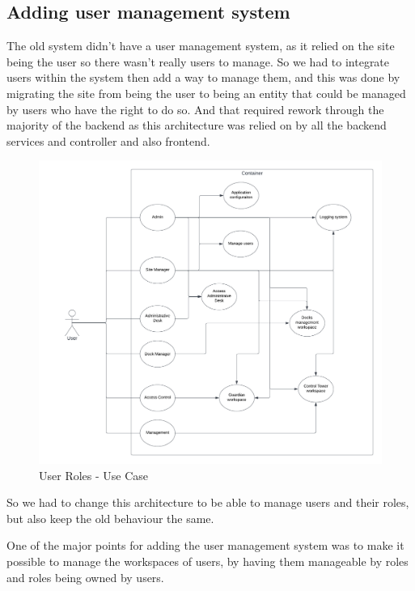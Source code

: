 \subsection{Adding user management system}\label{subsec:user_management}

The old system didn't have a user management system, as it relied on the site being the
user so there wasn't really users to manage. So we had to integrate users within the system
then add a way to manage them, and this was done by migrating the site from being the user
to being an entity that could be managed by users who have the right to do so.
And that required rework through the majority of the backend as this architecture was
relied on by all the backend services and controller and also frontend.

\begin{figure}[!ht]
    \centering
    \includegraphics[width=\textwidth]{images/useCaseRoles.png}
    \caption{\footnotesize{User Roles - Use Case}}
    \label{fig:useCaseRoles}
\end{figure}

So we had to change this architecture to be able to manage users and their roles, but also
keep the old behaviour the same.

One of the major points for adding the user management system was to make it
possible to manage the workspaces of users, by having them manageable by roles
and roles being owned by users.

